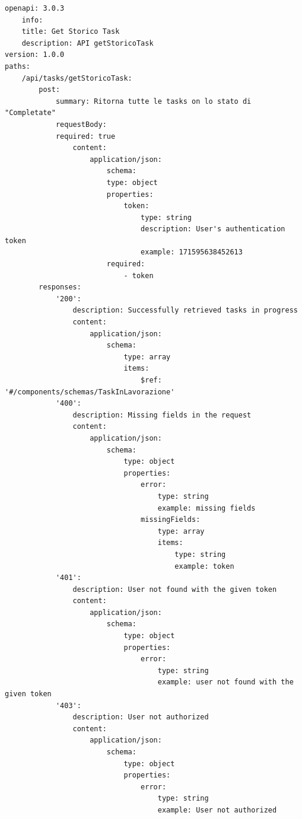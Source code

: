 \documentclass{report}
\begin{document}
\begin{verbatim}
openapi: 3.0.3
    info:
    title: Get Storico Task
    description: API getStoricoTask
version: 1.0.0
paths:
    /api/tasks/getStoricoTask:
        post:
            summary: Ritorna tutte le tasks on lo stato di "Completate"
            requestBody:
            required: true
                content:
                    application/json:
                        schema:
                        type: object
                        properties:
                            token:
                                type: string
                                description: User's authentication token
                                example: 171595638452613
                        required:
                            - token
        responses:
            '200':
                description: Successfully retrieved tasks in progress
                content:
                    application/json:
                        schema:
                            type: array
                            items:
                                $ref: '#/components/schemas/TaskInLavorazione'
            '400':
                description: Missing fields in the request
                content:
                    application/json:
                        schema:
                            type: object
                            properties:
                                error:
                                    type: string
                                    example: missing fields
                                missingFields:
                                    type: array
                                    items:
                                        type: string
                                        example: token
            '401':
                description: User not found with the given token
                content:
                    application/json:
                        schema:
                            type: object
                            properties:
                                error:
                                    type: string
                                    example: user not found with the given token
            '403':
                description: User not authorized
                content:
                    application/json:
                        schema:
                            type: object
                            properties:
                                error:
                                    type: string
                                    example: User not authorized
\end{verbatim}
\end{document}
